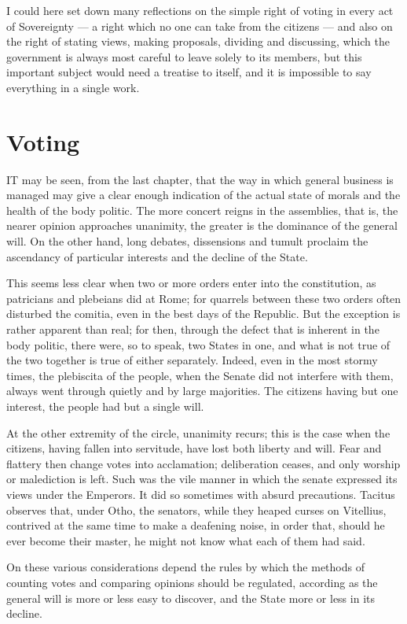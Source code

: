 \documentclass[12pt]{book}
\begin{document}
I could here set down many reflections on the simple right of voting in every act of Sovereignty — a right which no one can take from the citizens — and also on the right of stating views, making proposals, dividing and discussing, which the government is always most careful to leave solely to its members, but this important subject would need a treatise to itself, and it is impossible to say everything in a single work.

\section{Voting}
IT may be seen, from the last chapter, that the way in which general business is managed may give a clear enough indication of the actual state of morals and the health of the body politic. The more concert reigns in the assemblies, that is, the nearer opinion approaches unanimity, the greater is the dominance of the general will. On the other hand, long debates, dissensions and tumult proclaim the ascendancy of particular interests and the decline of the State.

This seems less clear when two or more orders enter into the constitution, as patricians and plebeians did at Rome; for quarrels between these two orders often disturbed the comitia, even in the best days of the Republic. But the exception is rather apparent than real; for then, through the defect that is inherent in the body politic, there were, so to speak, two States in one, and what is not true of the two together is true of either separately. Indeed, even in the most stormy times, the plebiscita of the people, when the Senate did not interfere with them, always went through quietly and by large majorities. The citizens having but one interest, the people had but a single will.

At the other extremity of the circle, unanimity recurs; this is the case when the citizens, having fallen into servitude, have lost both liberty and will. Fear and flattery then change votes into acclamation; deliberation ceases, and only worship or malediction is left. Such was the vile manner in which the senate expressed its views under the Emperors. It did so sometimes with absurd precautions. Tacitus observes that, under Otho, the senators, while they heaped curses on Vitellius, contrived at the same time to make a deafening noise, in order that, should he ever become their master, he might not know what each of them had said.

On these various considerations depend the rules by which the methods of counting votes and comparing opinions should be regulated, according as the general will is more or less easy to discover, and the State more or less in its decline.
\end{document}
